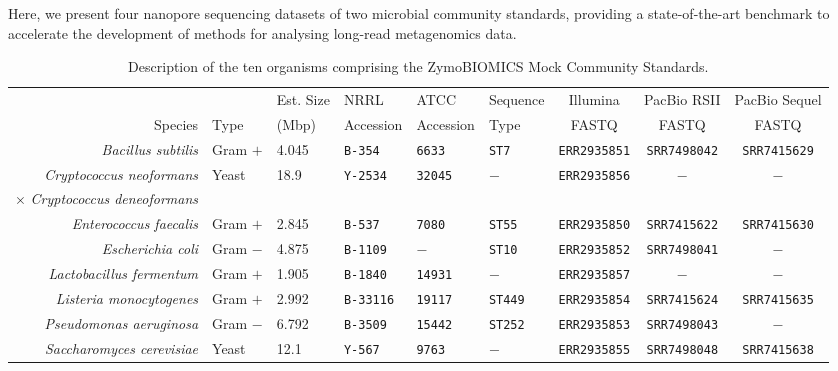 \documentclass[a4paper,num-refs]{oup-contemporary}
\begin{document}
Here, we present four nanopore sequencing datasets of two microbial community standards, providing a state-of-the-art benchmark to accelerate the development of methods for analysing long-read metagenomics data.

\begin{table}[t!]
\centering
\caption{Description of the ten organisms comprising the ZymoBIOMICS Mock Community Standards.}
\label{tab:strains}
\begin{tabular}{r | l | l | l | l | l | c | c c }
\toprule
 & & {Est. Size} & NRRL & ATCC & Sequence & Illumina & PacBio RSII & PacBio Sequel\\
 Species & Type & {(Mbp)} & Accession & Accession & Type &  FASTQ & FASTQ \cite{mcintyre2019single} & FASTQ \cite{mcintyre2019single}\\
\midrule
\textit{Bacillus subtilis}          & Gram $+$  & 4.045 & \texttt{B-354}   & \texttt{6633}& \texttt{ST7}   & \texttt{ERR2935851}    & \texttt{SRR7498042}	& \texttt{SRR7415629} \\
\textit{Cryptococcus neoformans}  & \multirow{2}{*}{Yeast} & \multirow{2}{*}{18.9} & \multirow{2}{*}{\texttt{Y-2534}}   & \multirow{2}{*}{\texttt{32045}} & \multirow{2}{*}{$-$} & \multirow{2}{*}{\texttt{ERR2935856}} & \multirow{2}{*}{$-$} & \multirow{2}{*}{$-$}\\
$\times$ \textit{Cryptococcus deneoformans} & & & & & \\
\textit{Enterococcus faecalis}      & Gram $+$ & 2.845 & \texttt{B-537}   & \texttt{7080}& \texttt{ST55}  & \texttt{ERR2935850} & \texttt{SRR7415622}	& \texttt{SRR7415630}\\
\textit{Escherichia coli}           & Gram $-$ & 4.875 & \texttt{B-1109}   & $-$& \texttt{ST10}  & \texttt{ERR2935852} & \texttt{SRR7498041} & $-$\\
\textit{Lactobacillus fermentum}    & Gram $+$ & 1.905 & \texttt{B-1840}   & \texttt{14931}& $-$  & \texttt{ERR2935857} & $-$ & $-$\\
\textit{Listeria monocytogenes}     & Gram $+$ & 2.992 & \texttt{B-33116}  & \texttt{19117}& \texttt{ST449}  & \texttt{ERR2935854} & \texttt{SRR7415624}	& \texttt{SRR7415635}\\
\textit{Pseudomonas aeruginosa}     & Gram $-$ & 6.792 & \texttt{B-3509}   & \texttt{15442}& \texttt{ST252}  & \texttt{ERR2935853} & \texttt{SRR7498043} & $-$\\
\textit{Saccharomyces cerevisiae}   & Yeast & 12.1 & \texttt{Y-567}    & \texttt{9763}& $-$  & \texttt{ERR2935855} & \texttt{SRR7498048}	& \texttt{SRR7415638}\\

\end{tabular}
\end{table}
\end{document}
